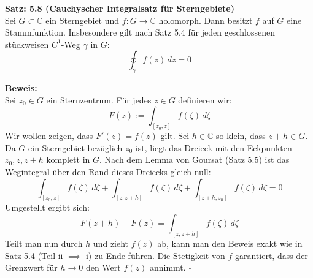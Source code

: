 \vspace{1em}
\noindent\textbf{Satz: 5.8 (Cauchyscher Integralsatz für Sterngebiete)} \\
Sei $G \subset \mathbb{C}$ ein Sterngebiet und $f: G \rightarrow \mathbb{C}$ holomorph. Dann besitzt $f$ auf $G$ eine Stammfunktion. Insbesondere gilt nach Satz 5.4 für jeden geschlossenen stückweisen $C^1$-Weg $\gamma$ in $G$:
\[
\oint_{\gamma} f(z) \, dz = 0
\]

\vspace{1em}
\noindent\textbf{Beweis:} \\
Sei $z_0 \in G$ ein Sternzentrum. Für jedes $z \in G$ definieren wir:
\[
F(z) := \int_{[z_0, z]} f(\zeta) \, d\zeta
\]
Wir wollen zeigen, dass $F'(z) = f(z)$ gilt. Sei $h \in \mathbb{C}$ so klein, dass $z+h \in G$. Da $G$ ein Sterngebiet bezüglich $z_0$ ist, liegt das Dreieck mit den Eckpunkten $z_0, z, z+h$ komplett in $G$. Nach dem Lemma von Goursat (Satz 5.5) ist das Wegintegral über den Rand dieses Dreiecks gleich null:
\[
\int_{[z_0, z]} f(\zeta) \, d\zeta + \int_{[z, z+h]} f(\zeta) \, d\zeta + \int_{[z+h, z_0]} f(\zeta) \, d\zeta = 0
\]
Umgestellt ergibt sich:
\[
F(z+h) - F(z) = \int_{[z, z+h]} f(\zeta) \, d\zeta
\]
Teilt man nun durch $h$ und zieht $f(z)$ ab, kann man den Beweis exakt wie in Satz 5.4 (Teil ii $\implies$ i) zu Ende führen. Die Stetigkeit von $f$ garantiert, dass der Grenzwert für $h \rightarrow 0$ den Wert $f(z)$ annimmt. \hfill $\square$
